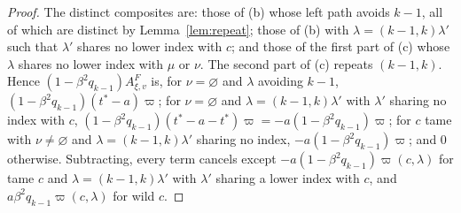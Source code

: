 \documentclass[11pt]{article}
\begin{document}
\begin{proof}
The distinct composites are: those of (b) whose left path avoids
$k-1$, all of which are distinct by Lemma~\ref{lem:repeat}; those of
(b) with $\lambda=(k-1,k)\lambda'$ such that $\lambda'$ shares no
lower index with $c$; and those of the first part of (c) whose
$\lambda$ shares no lower index with $\mu$ or $\nu$. The second part
of (c) repeats $(k-1,k)$. Hence $(1-\beta^2q_{k-1})A^F_{\xi,v}$ is, for
$\nu=\varnothing$ and $\lambda$ avoiding $k-1$,
$(1-\beta^2q_{k-1})(t^\ast-a)\varpi$; for $\nu=\varnothing$ and
$\lambda=(k-1,k)\lambda'$ with $\lambda'$ sharing no index with $c$,
$(1-\beta^2q_{k-1})(t^\ast-a-t^\ast)\varpi=-a(1-\beta^2q_{k-1})\varpi$;
for $c$ tame with $\nu\ne\varnothing$ and $\lambda=(k-1,k)\lambda'$
sharing no index, $-a(1-\beta^2q_{k-1})\varpi$; and $0$ otherwise.
Subtracting, every term cancels except
$-a(1-\beta^2q_{k-1})\varpi(c,\lambda)$ for tame $c$ and
$\lambda=(k-1,k)\lambda'$ with $\lambda'$ sharing a lower index with
$c$, and $a\beta^2q_{k-1}\varpi(c,\lambda)$ for wild $c$.
\end{proof}
\end{document}
